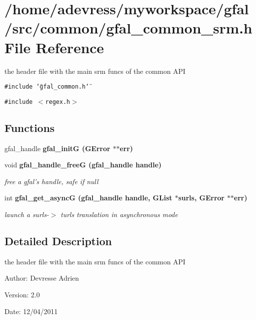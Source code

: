 \section{/home/adevress/myworkspace/gfal/src/common/gfal\_\-common\_\-srm.h File Reference}
\label{gfal__common__srm_8h}
the header file with the main srm funcs of the common API 

{\tt \#include \char`\"{}gfal\_\-common.h\char`\"{}}\par
{\tt \#include $<$regex.h$>$}\par
\subsection*{Functions}
\begin{CompactItemize}
\item 
gfal\_\-handle \bf{gfal\_\-init\-G} (GError $\ast$$\ast$err)
\item 
void \bf{gfal\_\-handle\_\-free\-G} (gfal\_\-handle handle)\label{gfal__common__srm_8h_9dbd943eaed291897d852fc3ae560058}

\begin{CompactList}\small\item\em free a gfal's handle, safe if null \item\end{CompactList}\item 
int \bf{gfal\_\-get\_\-async\-G} (gfal\_\-handle handle, GList $\ast$surls, GError $\ast$$\ast$err)
\begin{CompactList}\small\item\em launch a surls-$>$ turls translation in asynchronous mode \item\end{CompactList}\end{CompactItemize}


\subsection{Detailed Description}
the header file with the main srm funcs of the common API 

\begin{Desc}
\item[Author:]Devresse Adrien \end{Desc}
\begin{Desc}
\item[Version:]2.0 \end{Desc}
\begin{Desc}
\item[Date:]12/04/2011 \end{Desc}


